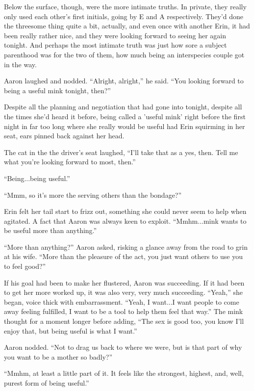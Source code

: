 \documentclass[12pt,letterpaper,oneside]{memoir}
\begin{document}
  Below the surface, though, were the more intimate truths. In private, they really only used each other's first initials, going by E and A respectively. They'd done the threesome thing quite a bit, actually, and even once with another Erin, it had been really rather nice, and they were looking forward to seeing her again tonight. And perhaps the most intimate truth was just how sore a subject parenthood was for the two of them, how much being an interspecies couple got in the way.

  Aaron laughed and nodded. ``Alright, alright,'' he said. ``You looking forward to being a useful mink tonight, then?''

  Despite all the planning and negotiation that had gone into tonight, despite all the times she'd heard it before, being called a 'useful mink' right before the first night in far too long where she really would be useful had Erin squirming in her seat, ears pinned back against her head.

  The cat in the the driver's seat laughed, ``I'll take that as a yes, then. Tell me what you're looking forward to most, then.''

  ``Being...being useful.''

  ``Mmm, so it's more the serving others than the bondage?''

  Erin felt her tail start to frizz out, something she could never seem to help when agitated. A fact that Aaron was always keen to exploit. ``Mmhm...mink wants to be useful more than anything.''

  ``More than anything?'' Aaron asked, risking a glance away from the road to grin at his wife. ``More than the pleasure of the act, you just want others to use you to feel good?''

  If his goal had been to make her flustered, Aaron was succeeding. If it had been to get her more worked up, it was also very, very much succeeding. ``Yeah,'' she began, voice thick with embarrassment. ``Yeah, I want...I want people to come away feeling fulfilled, I want to be a tool to help them feel that way.'' The mink thought for a moment longer before adding, ``The sex is good too, you know I'll enjoy that, but being useful is what I want.''

  Aaron nodded. ``Not to drag us back to where we were, but is that part of why you want to be a mother so badly?''

  ``Mmhm, at least a little part of it. It feels like the strongest, highest, and, well, purest form of being useful.''
\end{document}

